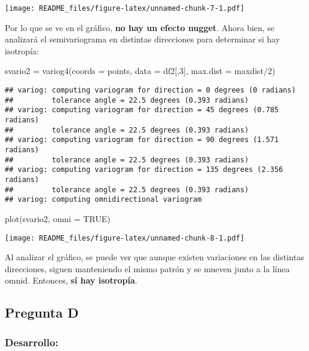 \documentclass[
]{article}
\newenvironment{Shaded}{\begin{snugshade}}{\end{snugshade}}
\newcommand{\AttributeTok}[1]{\textcolor[rgb]{0.77,0.63,0.00}{#1}}
\newcommand{\ConstantTok}[1]{\textcolor[rgb]{0.00,0.00,0.00}{#1}}
\newcommand{\DecValTok}[1]{\textcolor[rgb]{0.00,0.00,0.81}{#1}}
\newcommand{\FunctionTok}[1]{\textcolor[rgb]{0.00,0.00,0.00}{#1}}
\newcommand{\NormalTok}[1]{#1}
\newcommand{\OtherTok}[1]{\textcolor[rgb]{0.56,0.35,0.01}{#1}}
\newcommand{\SpecialCharTok}[1]{\textcolor[rgb]{0.00,0.00,0.00}{#1}}
\begin{document}
\texttt{[image: README\_files/figure-latex/unnamed-chunk-7-1.pdf]}

Por lo que se ve en el gráfico, \textbf{no hay un efecto nugget}. Ahora
bien, se analizará el semivariograma en distintas direcciones para
determinar si hay isotropía:

\begin{Shaded}
\begin{Highlighting}[]
\NormalTok{svario2 }\OtherTok{=} \FunctionTok{variog4}\NormalTok{(}\AttributeTok{coords =}\NormalTok{ points, }\AttributeTok{data =}\NormalTok{ df2[,}\DecValTok{3}\NormalTok{], }\AttributeTok{max.dist =}\NormalTok{ maxdist}\SpecialCharTok{/}\DecValTok{2}\NormalTok{)}
\end{Highlighting}
\end{Shaded}

\begin{verbatim}
## variog: computing variogram for direction = 0 degrees (0 radians)
##         tolerance angle = 22.5 degrees (0.393 radians)
## variog: computing variogram for direction = 45 degrees (0.785 radians)
##         tolerance angle = 22.5 degrees (0.393 radians)
## variog: computing variogram for direction = 90 degrees (1.571 radians)
##         tolerance angle = 22.5 degrees (0.393 radians)
## variog: computing variogram for direction = 135 degrees (2.356 radians)
##         tolerance angle = 22.5 degrees (0.393 radians)
## variog: computing omnidirectional variogram
\end{verbatim}

\begin{Shaded}
\begin{Highlighting}[]
\FunctionTok{plot}\NormalTok{(svario2, }\AttributeTok{omni =} \ConstantTok{TRUE}\NormalTok{)}
\end{Highlighting}
\end{Shaded}

\texttt{[image: README\_files/figure-latex/unnamed-chunk-8-1.pdf]}

Al analizar el gráfico, se puede ver que aunque existen variaciones en
las distintas direcciones, siguen manteniendo el mismo patrón y se
mueven junto a la línea omnid. Entonces, \textbf{sí hay isotropía}.

\hypertarget{pregunta-d}{%
\subsection{Pregunta D}\label{pregunta-d}}

\hypertarget{desarrollo-3}{%
\subsubsection{Desarrollo:}\label{desarrollo-3}}
\end{document}
